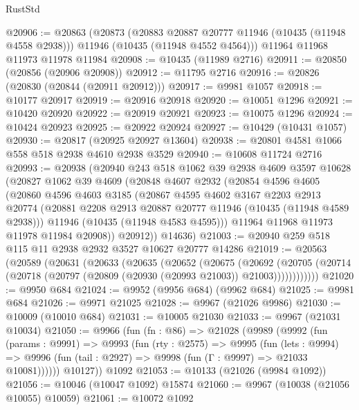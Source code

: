 \begin{lexlean}{RustStd}
\begin{coremodule}
@20906 := @20863
    (@20873
      (@20883 @20887 @20777 @11946 (@10435 (@11948 @4558 @2938)))
      @11946
      (@10435 (@11948 @4552 @4564)))
    @11964
    @11968
    @11973
    @11978
    @11984
@20908 := @10435 (@11989 @2716)
@20911 := @20850 (@20856 (@20906 @20908))
@20912 := @11795 @2716
@20916 := @20826 (@20830 (@20844 (@20911 @20912)))
@20917 := @9981 @1057
@20918 := @10177 @20917
@20919 := @20916 @20918
@20920 := @10051 @1296
@20921 := @10420 @20920
@20922 := @20919 @20921
@20923 := @10075 @1296
@20924 := @10424 @20923
@20925 := @20922 @20924
@20927 := @10429 (@10431 @1057)
@20930 := @20817 (@20925 @20927 @13604)
@20938 := @20801 @4581 @1066 @558 @518 @2938 @4610 @2938 @3529
@20940 := @10608 @11724 @2716
@20993 := @20938
    (@20940
      @243
      @518
      @1062
      @39
      @2938
      @4609
      @3597
      @10628
      (@20827
        @1062
        @39
        @4609
        (@20848
          @4607
          @2932
          (@20854
            @4596
            @4605
            (@20860
              @4596
              @4603
              @3185
              (@20867
                @4595
                @4602
                @3167
                @2203
                @2913
                @20774
                (@20881 @2208 @2913 @20887 @20777 @11946 (@10435 (@11948 @4589 @2938)))
                @11946
                (@10435 (@11948 @4583 @4595)))
              @11964
              @11968
              @11973
              @11978
              @11984
              @20908))
          @20912))
      @14636)
@21003 := @20940 @259 @518 @115 @11 @2938 @2932 @3527 @10627 @20777 @14286
@21019 := @20563
    (@20589
      (@20631
        (@20633
          (@20635
            (@20652
              (@20675
                (@20692
                  (@20705
                    (@20714 (@20718 (@20797 (@20809 (@20930 (@20993 @21003)) @21003))))))))))))
@21020 := @9950 @684
@21024 := @9952 (@9956 @684) (@9962 @684)
@21025 := @9981 @684
@21026 := @9971 @21025
@21028 := @9967 (@21026 @9986)
@21030 := @10009 (@10010 @684)
@21031 := @10005 @21030
@21033 := @9967 (@21031 @10034)
@21050 := @9966
    (fun (fn : @86) =>
    @21028
      (@9989
        (@9992
          (fun (params : @9991) =>
          @9993
            (fun (rty : @2575) =>
            @9995
              (fun (lets : @9994) =>
              @9996 (fun (tail : @2927) => @9998 (fun (Γ : @9997) => @21033 @10081))))))
        @10127))
    @1092
@21053 := @10133 (@21026 (@9984 @1092))
@21056 := @10046 (@10047 @1092) @15874
@21060 := @9967 (@10038 (@21056 @10055) @10059)
@21061 := @10072 @1092

\end{coremodule}
\end{lexlean}
